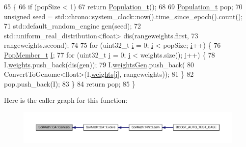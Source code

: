 \begin{DoxyCode}
65                                            \{
66   \textcolor{keywordflow}{if} (popSize < 1)
67     \textcolor{keywordflow}{return} \hyperlink{_soil_math_types_8h_a8d2d4c736cf817d048a2d66dec8b12ec}{Population\_t}();
68 
69   \hyperlink{_soil_math_types_8h_a8d2d4c736cf817d048a2d66dec8b12ec}{Population\_t} pop;
70   \textcolor{keywordtype}{unsigned} seed = std::chrono::system\_clock::now().time\_since\_epoch().count();
71   std::default\_random\_engine gen(seed);
72   std::uniform\_real\_distribution<float> dis(rangeweights.first,
73                                             rangeweights.second);
74 
75   \textcolor{keywordflow}{for} (uint32\_t \hyperlink{_comparision_pictures_2_createtest_image_8m_a6f6ccfcf58b31cb6412107d9d5281426}{i} = 0; \hyperlink{_comparision_pictures_2_createtest_image_8m_a6f6ccfcf58b31cb6412107d9d5281426}{i} < popSize; \hyperlink{_comparision_pictures_2_createtest_image_8m_a6f6ccfcf58b31cb6412107d9d5281426}{i}++) \{
76     \hyperlink{struct_pop_member_struct}{PopMember\_t} \hyperlink{_comparision_pictures_2_createtest_image_8m_aa7400a30a3cc1d4ef58923b44ecb7719}{I};
77     \textcolor{keywordflow}{for} (uint32\_t \hyperlink{_comparision_pictures_2_createtest_image_8m_ac86694252f8dfdb19aaeadc4b7c342c6}{j} = 0; \hyperlink{_comparision_pictures_2_createtest_image_8m_ac86694252f8dfdb19aaeadc4b7c342c6}{j} < weights.size(); \hyperlink{_comparision_pictures_2_createtest_image_8m_ac86694252f8dfdb19aaeadc4b7c342c6}{j}++) \{
78       I.\hyperlink{struct_pop_member_struct_aeba960170ef60a906c730cc24cd90367}{weights}.push\_back(dis(gen));
79       I.\hyperlink{struct_pop_member_struct_a072fadb4863e0cf77b55ad3b46b62522}{weightsGen}.push\_back(
80           ConvertToGenome<float>(I.\hyperlink{struct_pop_member_struct_aeba960170ef60a906c730cc24cd90367}{weights}[\hyperlink{_comparision_pictures_2_createtest_image_8m_ac86694252f8dfdb19aaeadc4b7c342c6}{j}], rangeweights));
81     \}
82     pop.push\_back(I);
83   \}
84   \textcolor{keywordflow}{return} pop;
85 \}
\end{DoxyCode}


Here is the caller graph for this function\+:\nopagebreak
\begin{figure}[H]
\begin{center}
\leavevmode
\includegraphics[width=350pt]{class_soil_math_1_1_g_a_a96cfe7cc5b3028a66b0136e72ea38cbc_icgraph}
\end{center}
\end{figure}


